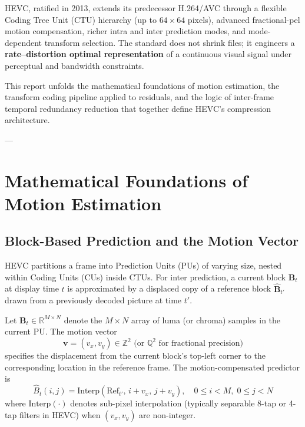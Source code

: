 \documentclass[11pt,journal,onecolumn]{IEEEtran}
\begin{document}
HEVC, ratified in 2013, extends its predecessor H.264/AVC through a flexible Coding Tree Unit (CTU) hierarchy (up to $64 \times 64$ pixels), advanced fractional-pel motion compensation, richer intra and inter prediction modes, and mode-dependent transform selection. The standard does not shrink files; it engineers a \textbf{rate--distortion optimal representation} of a continuous visual signal under perceptual and bandwidth constraints.

This report unfolds the mathematical foundations of motion estimation, the transform coding pipeline applied to residuals, and the logic of inter-frame temporal redundancy reduction that together define HEVC's compression architecture.

---

\section{Mathematical Foundations of Motion Estimation}

\subsection{Block-Based Prediction and the Motion Vector}
HEVC partitions a frame into Prediction Units (PUs) of varying size, nested within Coding Units (CUs) inside CTUs. For inter prediction, a current block $\mathbf{B}_t$ at display time $t$ is approximated by a displaced copy of a reference block $\hat{\mathbf{B}}_{t'}$ drawn from a previously decoded picture at time $t'$.

Let $\mathbf{B}_t \in \mathbb{R}^{M \times N}$ denote the $M \times N$ array of luma (or chroma) samples in the current PU. The motion vector
\begin{equation}
\mathbf{v} = (v_x, v_y) \in \mathbb{Z}^2 \text{ (or } \mathbb{Q}^2 \text{ for fractional precision)}
\end{equation}
specifies the displacement from the current block's top-left corner to the corresponding location in the reference frame. The motion-compensated predictor is
\begin{equation}
\hat{B}_t(i, j) = \mathrm{Interp}\!\left(\mathrm{Ref}_{t'},\, i + v_x,\, j + v_y\right), \quad 0 \le i < M,\; 0 \le j < N
\end{equation}
where $\mathrm{Interp}(\cdot)$ denotes sub-pixel interpolation (typically separable 8-tap or 4-tap filters in HEVC) when $(v_x, v_y)$ are non-integer.
\end{document}
